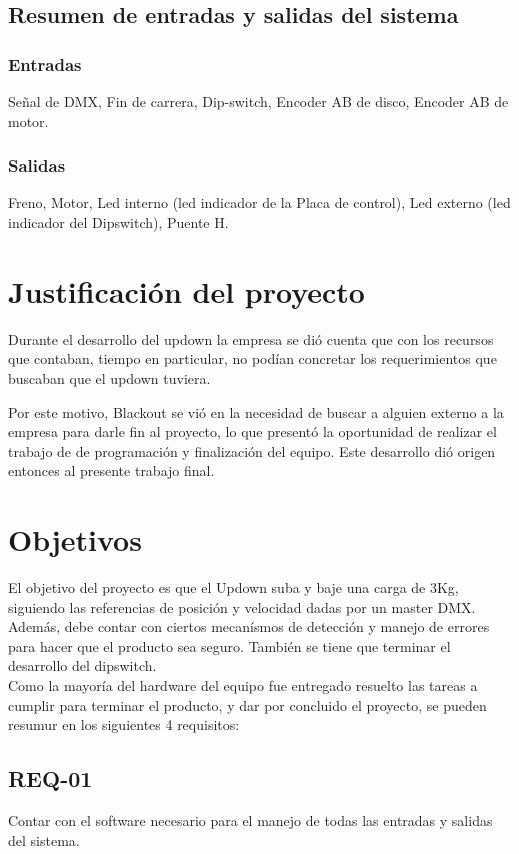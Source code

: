 \subsection{Resumen de entradas y salidas del sistema}
\subsubsection{Entradas} 
Señal de DMX, Fin de carrera, Dip-switch, Encoder AB de disco, Encoder AB de motor.\\
\subsubsection{Salidas}
Freno, Motor, Led interno (led indicador de la Placa de control), Led externo (led indicador del Dipswitch), Puente H.

\newpage
\section{Justificación del proyecto} \label{sec:\thesection}
Durante el desarrollo del updown la empresa se dió cuenta que con los recursos que contaban, tiempo en particular, no podían concretar los requerimientos que buscaban que el updown tuviera. 

Por este motivo, Blackout se vió en la necesidad de buscar a alguien externo a la empresa para darle fin al proyecto, lo que presentó la oportunidad de realizar el trabajo de de programación y finalización del equipo. Este desarrollo dió origen entonces al presente trabajo final.

\section{Objetivos} \label{sec:\thesection}
El objetivo del proyecto es que el Updown suba y baje una carga de 3Kg, siguiendo las referencias de posición y velocidad dadas por un master DMX. Además, debe contar con ciertos mecanísmos de detección y manejo de errores para hacer que el producto sea seguro. También se tiene que terminar el desarrollo del dipswitch.\\
Como la mayoría del hardware del equipo fue entregado resuelto las tareas a cumplir para terminar el producto, y dar por concluido el proyecto, se pueden resumur en los siguientes 4 requisitos:

\subsection{REQ-01}
Contar con el software necesario para el manejo de todas las entradas y salidas del sistema.
